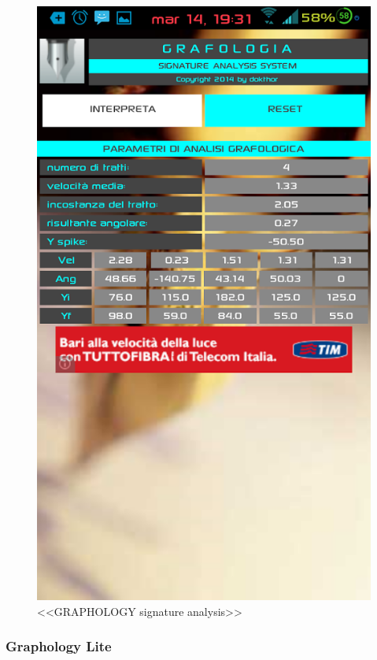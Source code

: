 \begin{figure}[ht]
    \centering
    \label{fig:domain:analog:graphology_sign_analysis}
    \includegraphics[height=0.5\textheight]{figures/analog_graphology_sign_analysis.png}
    \caption{<<GRAPHOLOGY signature analysis>>}
\end{figure}

\subsubsection{Graphology Lite}
\label{sub:domain:analogs:graphology_lite}

